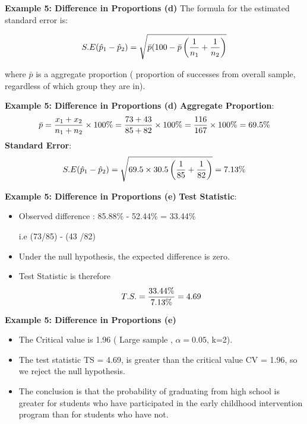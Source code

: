 
\noindent \textbf{Example 5: Difference in Proportions (d)}
The formula for the estimated standard error is:

\[ S.E (\hat{p}_1 - \hat{p}_2)  = \sqrt{\bar{p}(100- \bar{p} \left( {1 \over n_1} + {1 \over n_2}  \right)} \]


where $\bar{p}$ is a aggregate proportion ( proportion of successes from overall sample, regardless of which group they are in).







\noindent \textbf{Example 5: Difference in Proportions (d)}
\textbf{Aggregate Proportion}:\\
\[ \bar{p}  = {x_1  + x_2 \over n_1 + n_2} \times 100\% = {73+43 \over 85 + 82} \times 100\% = { 116 \over 167}\times 100\% = 69.5\% \]
\textbf{Standard Error}:\\
\[ S.E (\hat{p}_1 - \hat{p}_2)  =  \sqrt{69.5 \times 30.5 \left( {1 \over 85} + {1 \over 82}  \right)}  = 7.13\% \]





\noindent \textbf{Example 5: Difference in Proportions (e)}
\textbf{Test Statistic}:
\begin{itemize} \item Observed difference :
85.88\% - 52.44\%  = 33.44\% \item [ i.e (73/85) - (43 /82) ]
\item Under the null hypothesis, the expected difference is zero.
\item Test Statistic is therefore \[T.S. = {33.44\% \over 7.13\%} = 4.69\]
\end{itemize}



\noindent \textbf{Example 5: Difference in Proportions (e)}
\begin{itemize}
\item The Critical value is 1.96 ( Large sample , $\alpha = 0.05$, k=2).

\item The test statistic TS = 4.69, is greater than the critical value CV = 1.96, so we reject the null hypothesis.
\item The conclusion is that the probability of graduating from high school is greater for students who have participated in the early childhood intervention program than for students who have not.
\end{itemize}









